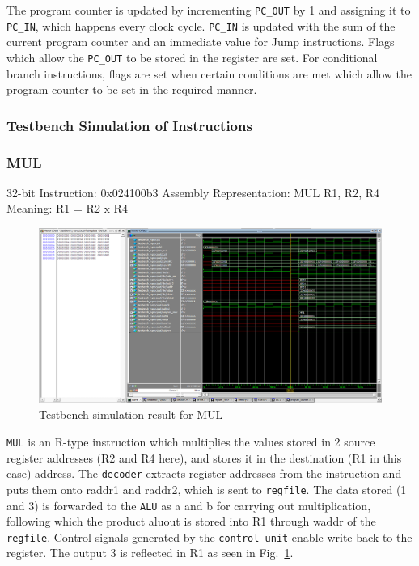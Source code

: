 The program counter is updated by incrementing \verb|PC_OUT| by 1 and assigning it to \verb|PC_IN|, which happens every clock cycle. \verb|PC_IN| is updated with the sum of the current program counter and an immediate value for Jump instructions. Flags which allow the \verb|PC_OUT| to be stored in the register are set. For conditional branch instructions, flags are set when certain conditions are met which allow the program counter to be set in the required manner.

\subsubsection{Testbench Simulation of Instructions}
\label{sect6_4_3_2}

\subsubsection*{MUL}
\label{sect6_4_3_2a}

32-bit Instruction: 0x024100b3 \newline
Assembly Representation: MUL R1, R2, R4
Meaning: R1 = R2 x R4

\begin{figure}[h!]
\centering
\includegraphics[width=12cm]{figures/RISCV_Implementation_MUL.PNG}
\caption{Testbench simulation result for MUL}
\label{fig:riscv8}
\end{figure}

\verb|MUL| is an R-type instruction which multiplies the values stored in 2 source register addresses (R2 and R4 here), and stores it in the destination (R1 in this case) address. The \verb|decoder| extracts register addresses from the instruction and puts them onto raddr1 and raddr2, which is sent to \verb|regfile|. The data stored (1 and 3) is forwarded to the \verb|ALU| as a and b for carrying out multiplication, following which the product aluout is stored into R1 through waddr of the \verb|regfile|. Control signals generated by the \verb|control unit| enable write-back to the register. The output 3 is reflected in R1 as seen in Fig.~\ref{fig:riscv8}.

